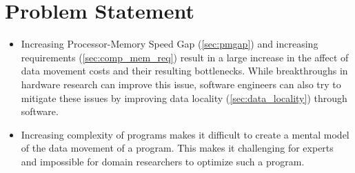 \section{Problem Statement}\label{sec:problem_statement}
\begin{itemize}
  \item Increasing Processor-Memory Speed Gap (\ref{sec:pmgap}) and increasing requirements (\ref{sec:comp_mem_req}) result in a large increase in the affect of data movement costs and their resulting bottlenecks. While breakthroughs in hardware research can improve this issue, software engineers can also try to mitigate these issues by improving data locality (\ref{sec:data_locality}) through software.
  \item Increasing complexity of programs makes it difficult to create a mental model of the data movement of a program. This makes it challenging for experts and impossible for domain researchers to optimize such a program.
\end{itemize}
